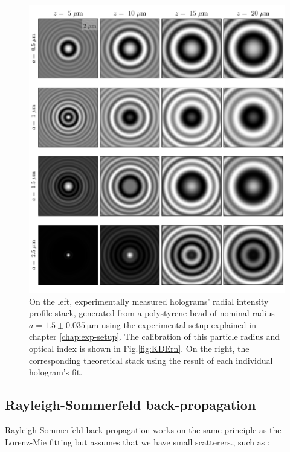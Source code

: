 \begin{figure}
	\centering
	\includegraphics{02_body/chapter2/images/holo_size_exemple/holos_fix_n.pdf}
	\caption{On the left, experimentally measured  holograms' radial intensity profile stack, generated from a polystyrene bead of nominal radius $a = 1.5 \pm 0.035 ~ \mathrm{\mu m} $ using the experimental setup explained in chapter \ref{chap:exp-setup}. The calibration of this particle radius and optical index is shown in Fig.\ref{fig:KDErn}. On the right, the corresponding theoretical stack using the result of each individual hologram's fit.}
	\label{fig:holo_fix_n}
\end{figure}

\clearpage
\newpage

\subsection{Rayleigh-Sommerfeld back-propagation}





Rayleigh-Sommerfeld back-propagation \cite{wilson_3d_2012} works on the same principle as the Lorenz-Mie fitting but assumes that we have small scatterers., such as :

